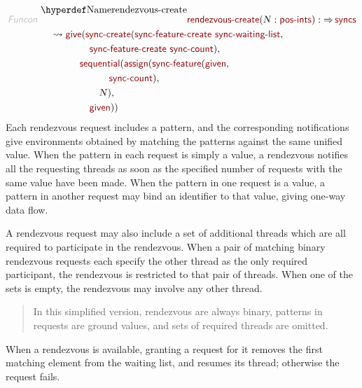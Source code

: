 \begin{align*}
  \KEY{Funcon} ~ 
  & \NAMEDECL{rendezvous-create}(\VAR{N} : \NAME{pos-ints}) :  \TO \NAME{syncs} \\
  & \quad \leadsto \NAME{give}
                     ( \NAME{sync-create}
                         ( \NAME{sync-feature-create} ~
                             \NAME{sync-waiting-list}, \\&\quad \quad \quad \quad \quad 
                           \NAME{sync-feature-create} ~
                             \NAME{sync-count} ), \\&\quad \quad \quad \quad 
                       \NAME{sequential}
                         ( \NAME{assign}
                             ( \NAME{sync-feature}
                                 ( \NAME{given}, \\&\quad \quad \quad \quad \quad \quad \quad 
                                   \NAME{sync-count} ), \\&\quad \quad \quad \quad \quad \quad 
                               \VAR{N} ), \\&\quad \quad \quad \quad \quad 
                           \NAME{given} ) )
\end{align*}
Each rendezvous request includes a pattern, and the corresponding notifications
give environments obtained by matching the patterns against the same unified
value. When the pattern in each request is simply a value, a rendezvous notifies
all the requesting threads as soon as the specified number of requests with the
same value have been made. When the pattern in one request is a value, a pattern
in another request may bind an identifier to that value, giving one-way data flow.

A rendezvous request may also include a set of additional threads which are all
required to participate in the rendezvous. When a pair of matching binary
rendezvous requests each specify the other thread as the only required
participant, the rendezvous is restricted to that pair of threads. When one of
the sets is empty, the rendezvous may involve any other thread.

\begin{quote}
In this simplified version, rendezvous are always binary, patterns in
requests are ground values, and sets of required threads are omitted.
\end{quote}

When a rendezvous is available, granting a request for it removes the first
matching element from the waiting list, and resumes its thread; otherwise the
request fails.

